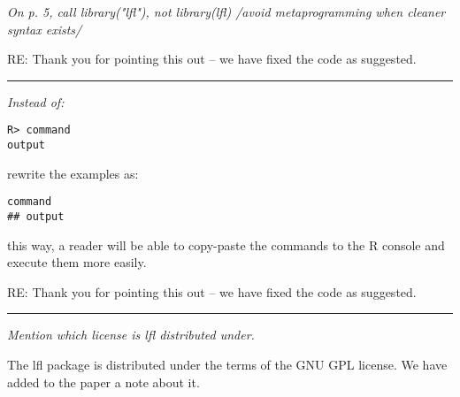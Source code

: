 \documentclass{article}
\newcommand{\separator}{\rule{\textwidth}{0.4pt}}
\begin{document}
{ \it On p. 5, call library("lfl"), not library(lfl) /avoid metaprogramming when cleaner syntax exists/ }

RE: Thank you for pointing this out -- we have fixed the code as suggested. 

\separator

{ \it Instead of:
\begin{verbatim}
R> command
output
\end{verbatim}
rewrite the examples as:
\begin{verbatim}
command
## output
\end{verbatim}
this way, a reader will be able to copy-paste the commands to the R console and execute them more easily.
}

RE: Thank you for pointing this out -- we have fixed the code as suggested. 

\separator

{ \it Mention which license is lfl distributed under. }

The lfl package is distributed under the terms of the GNU GPL license. We have added to the paper a note about it.
\end{document}
